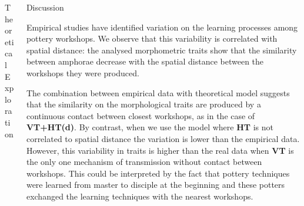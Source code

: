 \documentclass[final]{beamer}
\newlength{\sepwid}
\newlength{\onecolwid}
\newlength{\twocolwid}
\begin{document}
\begin{frame}[t]
\begin{columns}[t]
\begin{column}{\twocolwid}
\begin{block}{Theoretical Exploration}
\end{block}
\end{column}



\begin{column}{\onecolwid} %

\begin{block}{Discussion}
\justify

Empirical studies have identified variation on the learning processes among pottery workshops. We observe that this variability is correlated with spatial distance: the analysed morphometric traits show that the similarity between amphorae decrease with the spatial distance between the workshops they were produced.

The combination between empirical data with theoretical model suggests that the similarity on the morphological traits are produced by a continuous contact between closest workshops, as in the case of \textbf{VT+HT(d)}. By contrast, when we use the model where \textbf{HT} is not correlated to spatial distance the variation is lower than the empirical data. However, this variability in traits is higher than the real data when \textbf{VT} is the only one mechanism of transmission without contact between workshops. This could be interpreted by the fact that pottery techniques were learned from master to disciple at the beginning and these potters exchanged the learning techniques with the nearest workshops. 









\end{block}
\end{column}
\end{columns}
\end{frame}
\end{document}
